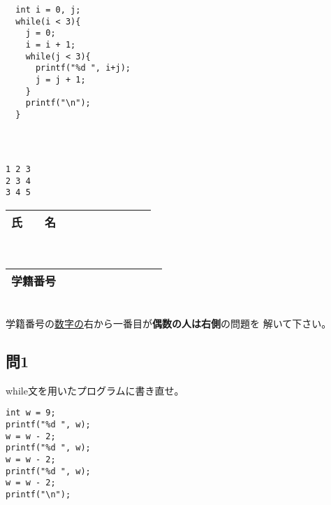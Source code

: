 \documentclass[a4j]{jarticle}
\begin{document}
\begin{multicols*}{2}
\begin{verbatim}
  int i = 0, j;
  while(i < 3){
    j = 0;
    i = i + 1;
    while(j < 3){
      printf("%d ", i+j);
      j = j + 1;
    }
    printf("\n");
  }
\end{verbatim}


\ifnum {}
\begin{verbatim}



\end{verbatim}
\else
\begin{verbatim}
1 2 3
2 3 4
3 4 5
\end{verbatim}
\fi





%
%


\vfill

\mbox{}





\noindent
\begin{tabular}[t]{|c|cccccccc|}\hline
氏　　名 & & & & & & & & \\ \hline
\end{tabular}\\
\begin{tabular}[t]{|c|c|c|c|c|c|c|c|c|c|}\hline
学籍番号 & & & & & & & & \\ \hline
\end{tabular}\\
学籍番号の\underline{数字の}右から一番目が{\bfseries 偶数の人は右側}の問題を
解いて下さい。
\vspace{-5ex}




\subsection*{問1}


{\ttfamily while}文を用いたプログラムに書き直せ。
\begin{verbatim}
int w = 9;
printf("%d ", w);
w = w - 2;
printf("%d ", w);
w = w - 2;
printf("%d ", w);
w = w - 2;
printf("\n");
\end{verbatim}



\end{multicols*}
\end{document}

